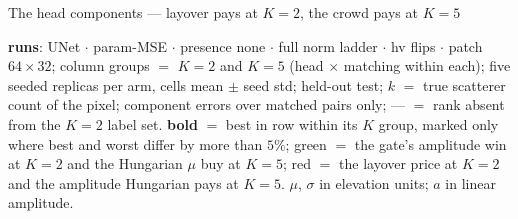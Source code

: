 \begin{frame}{The head components --- layover pays at $K{=}2$, the crowd pays at $K{=}5$}
  \parbox{0.94\textwidth}{\tiny\color{soft} \textbf{runs}: UNet $\cdot$ param-MSE $\cdot$ presence none $\cdot$ full norm ladder $\cdot$ hv flips $\cdot$ patch $64{\times}32$; column groups $=$ $K{=}2$ and $K{=}5$ (head $\times$ matching within each); five seeded replicas per arm, cells mean $\pm$ seed std; held-out test; $k$ $=$ true scatterer count of the pixel; component errors over matched pairs only; --- $=$ rank absent from the $K{=}2$ label set. \textbf{bold} $=$ best in row within its $K$ group, marked only where best and worst differ by more than $5\%$; \textcolor{good}{green} $=$ the gate's amplitude win at $K{=}2$ and the Hungarian $\mu$ buy at $K{=}5$; \textcolor{accent}{red} $=$ the layover price at $K{=}2$ and the amplitude Hungarian pays at $K{=}5$. $\mu$, $\sigma$ in elevation units; $a$ in linear amplitude.\par}
\end{frame}

